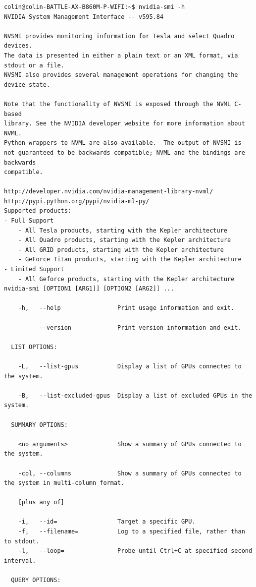 \begin{lstlisting}
colin@colin-BATTLE-AX-B860M-P-WIFI:~$ nvidia-smi -h
NVIDIA System Management Interface -- v595.84

NVSMI provides monitoring information for Tesla and select Quadro devices.
The data is presented in either a plain text or an XML format, via stdout or a file.
NVSMI also provides several management operations for changing the device state.

Note that the functionality of NVSMI is exposed through the NVML C-based
library. See the NVIDIA developer website for more information about NVML.
Python wrappers to NVML are also available.  The output of NVSMI is
not guaranteed to be backwards compatible; NVML and the bindings are backwards
compatible.

http://developer.nvidia.com/nvidia-management-library-nvml/
http://pypi.python.org/pypi/nvidia-ml-py/
Supported products:
- Full Support
    - All Tesla products, starting with the Kepler architecture
    - All Quadro products, starting with the Kepler architecture
    - All GRID products, starting with the Kepler architecture
    - GeForce Titan products, starting with the Kepler architecture
- Limited Support
    - All Geforce products, starting with the Kepler architecture
nvidia-smi [OPTION1 [ARG1]] [OPTION2 [ARG2]] ...

    -h,   --help                Print usage information and exit.

          --version             Print version information and exit.

  LIST OPTIONS:

    -L,   --list-gpus           Display a list of GPUs connected to the system.

    -B,   --list-excluded-gpus  Display a list of excluded GPUs in the system.

  SUMMARY OPTIONS:

    <no arguments>              Show a summary of GPUs connected to the system.

    -col, --columns             Show a summary of GPUs connected to the system in multi-column format.

    [plus any of]

    -i,   --id=                 Target a specific GPU.
    -f,   --filename=           Log to a specified file, rather than to stdout.
    -l,   --loop=               Probe until Ctrl+C at specified second interval.

  QUERY OPTIONS:


\end{lstlisting}
